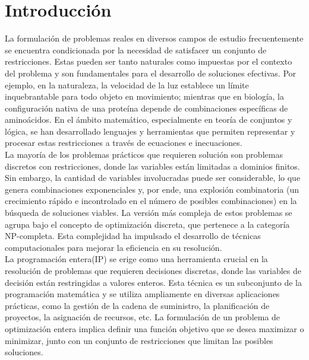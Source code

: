 \documentclass[12pt]{report}
\begin{document}
\newpage



\tableofcontents

\newpage
\chapter{Introducción}

La formulación de problemas reales en diversos campos de estudio frecuentemente se encuentra condicionada por la necesidad de satisfacer un conjunto de restricciones. Estas pueden ser tanto naturales como impuestas por el contexto del problema y son fundamentales para el desarrollo de soluciones efectivas. Por ejemplo, en la naturaleza, la velocidad de la luz establece un límite inquebrantable para todo objeto en movimiento; mientras que en biología, la configuración nativa de una proteína depende de combinaciones específicas de aminoácidos. En el ámbito matemático, especialmente en teoría de conjuntos y lógica, se han desarrollado lenguajes y herramientas que permiten representar y procesar estas restricciones a través de ecuaciones e inecuaciones. \\

La mayoría de los problemas prácticos que requieren solución son problemas discretos con restricciones, donde las variables están limitadas a dominios finitos. Sin embargo, la cantidad de variables involucradas puede ser considerable, lo que genera combinaciones exponenciales y, por ende, una explosión combinatoria (un crecimiento rápido e incontrolado en el número de posibles combinaciones) en la búsqueda de soluciones viables. La versión más compleja de estos problemas se agrupa bajo el concepto de optimización discreta, que pertenece a la categoría NP-completa. Esta complejidad ha impulsado el desarrollo de técnicas computacionales para mejorar la eficiencia en su resolución.  \\

La programación entera(IP) se erige como una herramienta crucial en la resolución de problemas que requieren decisiones discretas, donde las variables de decisión están restringidas a valores enteros. Esta técnica es un subconjunto de la programación matemática y se utiliza ampliamente en diversas aplicaciones prácticas, como la gestión de la cadena de suministro, la planificación de proyectos, la asignación de recursos, etc. La formulación de un problema de optimización entera implica definir una función objetivo que se desea maximizar o minimizar, junto con un conjunto de restricciones que limitan las posibles soluciones.  \\
\end{document}
